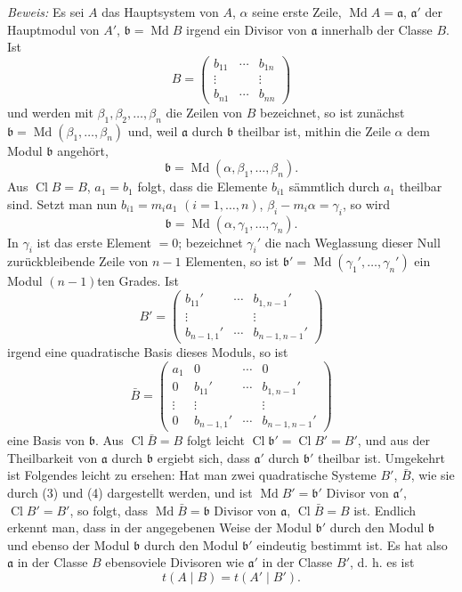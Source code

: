 \documentclass[11pt,a4paper]{article}
\newcommand{\Cl}{\operatorname{Cl}}
\newcommand{\Md}{\operatorname{Md}}
\begin{document}
\emph{Beweis:} Es sei $A$ das Hauptsystem von $A$, $\alpha$ seine erste Zeile, $\Md A=\mathfrak a$, $\mathfrak a'$ der Hauptmodul von $A'$, $\mathfrak b=\Md B$ irgend ein Divisor von $\mathfrak a$ innerhalb der Classe $B$. Ist
\[
 B=\begin{pmatrix}
 b_{11}&\cdots&b_{1n}\\
 \vdots&&\vdots\\
 b_{n1}&\cdots&b_{nn}
 \end{pmatrix}
\]
und werden mit $\beta_1,\beta_2,\ldots,\beta_n$ die Zeilen von $B$ bezeichnet, so ist zunächst $\mathfrak b=\Md(\beta_1,\ldots,\beta_n)$ und, weil $\mathfrak a$ durch $\mathfrak b$ theilbar ist, mithin die Zeile $\alpha$ dem Modul $\mathfrak b$ angehört,
\[
 \mathfrak b=\Md(\alpha,\beta_1,\ldots,\beta_n).
\]
Aus $\Cl B=B$, $a_1=b_1$ folgt, dass die Elemente $b_{i1}$ sämmtlich durch $a_1$ theilbar sind. Setzt man nun $b_{i1}=m_i a_1$ $(i=1,\ldots,n)$, $\beta_i-m_i\alpha=\gamma_i$, so wird
\[
 \mathfrak b=\Md(\alpha,\gamma_1,\ldots,\gamma_n).
\]
In $\gamma_i$ ist das erste Element $=0$; bezeichnet $\gamma_i'$ die nach Weglassung dieser Null zurückbleibende Zeile von $n-1$ Elementen, so ist $\mathfrak b'=\Md(\gamma_1',\ldots,\gamma_n')$ ein Modul $(n-1)$ten Grades. Ist
\begin{equation}
 B'=\begin{pmatrix}
 b_{11}'&\cdots&b_{1,n-1}'\\
 \vdots&&\vdots\\
 b_{n-1,1}'&\cdots&b_{n-1,n-1}'
 \end{pmatrix}
\tag{3}
\end{equation}
irgend eine quadratische Basis dieses Moduls, so ist
\begin{equation}
 \bar B=\begin{pmatrix}
 a_1&0&\cdots&0\\
 0&b_{11}'&\cdots&b_{1,n-1}'\\
 \vdots&\vdots&&\vdots\\
 0&b_{n-1,1}'&\cdots&b_{n-1,n-1}'
 \end{pmatrix}
\tag{4}
\end{equation}
eine Basis von $\mathfrak b$. Aus $\Cl\bar B=B$ folgt leicht $\Cl\mathfrak b'=\Cl B'=B'$, und aus der Theilbarkeit von $\mathfrak a$ durch $\mathfrak b$ ergiebt sich, dass $\mathfrak a'$ durch $\mathfrak b'$ theilbar ist. Umgekehrt ist Folgendes leicht zu ersehen: Hat man zwei quadratische Systeme $B'$, $\bar B$, wie sie durch (3) und (4) dargestellt werden, und ist $\Md B'=\mathfrak b'$ Divisor von $\mathfrak a'$, $\Cl B'=B'$, so folgt, dass $\Md\bar B=\mathfrak b$ Divisor von $\mathfrak a$, $\Cl\bar B=B$ ist. Endlich erkennt man, dass in der angegebenen Weise der Modul $\mathfrak b'$ durch den Modul $\mathfrak b$ und ebenso der Modul $\mathfrak b$ durch den Modul $\mathfrak b'$ eindeutig bestimmt ist. Es hat also $\mathfrak a$ in der Classe $B$ ebensoviele Divisoren wie $\mathfrak a'$ in der Classe $B'$, d. h. es ist
\[
 t(A\mid B)=t(A'\mid B').
\]
\end{document}
